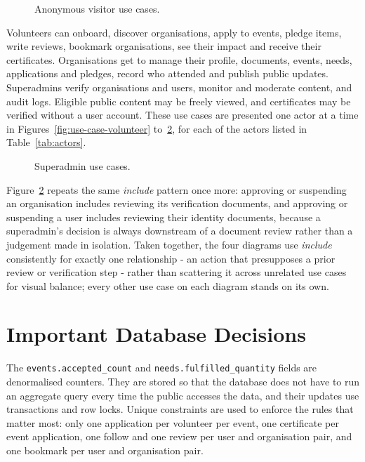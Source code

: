 \begin{figure}[H]
    \centering
    \caption{Anonymous visitor use cases.}
    \label{fig:use-case-anon}
\end{figure}

Volunteers can onboard, discover organisations, apply to events, pledge items, write reviews, bookmark organisations, see their impact and receive their certificates. Organisations get to manage their profile, documents, events, needs, applications and pledges, record who attended and publish public updates. Superadmins verify organisations and users, monitor and moderate content, and audit logs. Eligible public content may be freely viewed, and certificates may be verified without a user account. These use cases are presented one actor at a time in Figures~\ref{fig:use-case-volunteer} to~\ref{fig:use-case-admin}, for each of the actors listed in Table~\ref{tab:actors}.

\vspace{0.3in}
\begin{figure}[H]
    \centering
    \caption{Superadmin use cases.}
    \label{fig:use-case-admin}
\end{figure}

\noindent Figure~\ref{fig:use-case-admin} repeats the same \emph{include} pattern once more: approving or suspending an organisation includes reviewing its verification documents, and approving or suspending a user includes reviewing their identity documents, because a superadmin's decision is always downstream of a document review rather than a judgement made in isolation. Taken together, the four diagrams use \emph{include} consistently for exactly one relationship - an action that presupposes a prior review or verification step - rather than scattering it across unrelated use cases for visual balance; every other use case on each diagram stands on its own.

\section{Important Database Decisions}
The \texttt{events.accepted\_count} and \texttt{needs.fulfilled\_quantity} fields are denormalised counters. They are stored so that the database does not have to run an aggregate query every time the public accesses the data, and their updates use transactions and row locks. Unique constraints are used to enforce the rules that matter most: only one application per volunteer per event, one certificate per event application, one follow and one review per user and organisation pair, and one bookmark per user and organisation pair.

